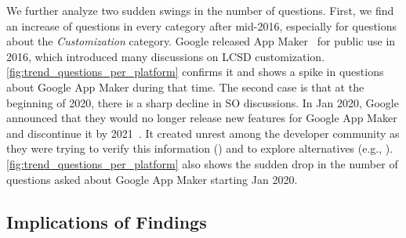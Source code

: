 We further analyze two sudden swings in the number of questions. First, we find an increase of questions in every category after mid-2016, especially for questions about the \textit{Customization} category. Google released App Maker~\cite{googleappmaker} for public use in 2016, which introduced many discussions on LCSD customization. \fig\ref{fig:trend_questions_per_platform}  confirms it and shows a spike in questions about Google App Maker during that time. The second case is that at the beginning of 2020, there is a sharp decline in SO discussions. In Jan 2020, Google announced that they would no longer release new features for Google App Maker and discontinue it by 2021~\cite{google-disc}. It created unrest among the developer community as they were trying to verify this information () and to explore alternatives (e.g., ). \fig\ref{fig:trend_questions_per_platform} also shows the sudden drop in the number of questions asked about Google App Maker starting Jan 2020.



\subsection{Implications of Findings} 


